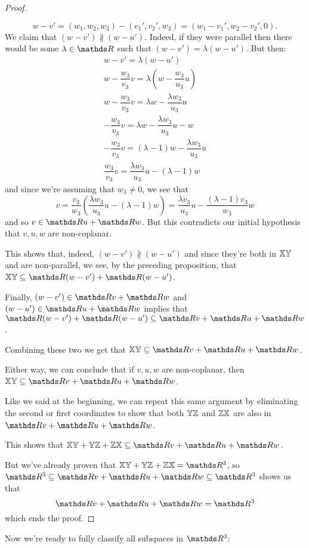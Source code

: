 \begin{proof}
\begin{itemize}
		\[w-v'=(w_1,w_2,w_3)-(v_1',v_2',w_3)=(w_1-v_1',w_2-v_2',0).\]We claim that $(w-v')\nparallel(w-u')$. Indeed, if they were parallel then there would be some $\lambda\in \R$ such that $(w-v')=\lambda(w-u')$. But then:
		\begin{gather*}
			w-v'=\lambda(w-u')\\
			w-\dfrac{w_3}{v_3}v=\lambda\left(w-\dfrac{w_3}{u_3}u\right)\\
			w-\dfrac{w_3}{v_3}v=\lambda w-\dfrac{\lambda w_3}{u_3}u\\
			-\dfrac{w_3}{v_3}v=\lambda w-\dfrac{\lambda w_3}{u_3}u-w\\
			-\dfrac{w_3}{v_3}v=(\lambda-1) w-\dfrac{\lambda w_3}{u_3}u\\
			\dfrac{w_3}{v_3}v=\dfrac{\lambda w_3}{u_3}u-(\lambda-1) w
		\end{gather*}and since we're assuming that $w_3\neq 0$, we see that 
		\[v=\frac{v_3}{w_3}\left(\dfrac{\lambda w_3}{u_3}u-(\lambda-1) w\right)=\frac{\lambda v_3}{u_3}u-\frac{(\lambda-1)v_3}{w_3}w\]and so $v\in\R u+\R w$. But this contradicts our initial hypothesis that $v,u,w$ are non-coplanar.
		
		This shows that, indeed, $(w-v')\nparallel(w-u')$ and since they're both in $\mathbb{XY}$ and are non-parallel, we see, by the preceding proposition, that $\mb{XY}\subseteq\R(w-v')+\R(w-u')$.
		
		Finally, $(w-v')\in\R v+\R w$ and $(w-u')\in\R u+\R w$ implies that $\R(w-v')+\R(w-u')\subseteq\R v+\R u+\R w$.
		
		Combining these two we get that $\mb{XY}\subseteq \R v+\R u+\R w$.
	\end{itemize}

Either way, we can conclude that if $v,u,w$ are non-coplanar, then $\mb{XY}\subseteq \R v+\R u+\R w$.

\bigskip
Like we said at the beginning, we can repeat this same argument by eliminating the second or first coordinates to show that both $\mathbb{YZ}$ and $\mathbb{ZX}$ are also in $\R v+\R u+\R w$.

This shows that $\mb{XY+YZ+ZX}\subseteq\R v+\R u+\R w$.

But we've already proven that $\mb{XY+YZ+ZX}=\R^3$, so $\R^3\subseteq\R v+\R u+\R w\subseteq\R^3$ shows us that 
\[\R v+\R u+\R w=\R^3\]which ends the proof.
\end{proof}

Now we're ready to fully classify all subspaces in $\R^3$:

